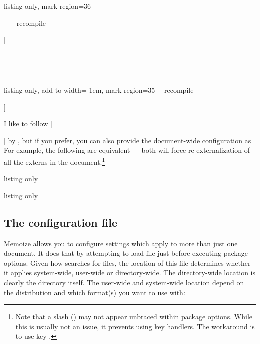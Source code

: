 \documentclass[a4paper,11pt]{article}
\begin{document}
\begin{tcbraster}[raster columns=2, raster equal height=rows, raster force size=false]
\begin{tcblisting}{listing only, mark region={3}{6}}
~{~
  ~\mmzset~{recompile}
  \begin{forest}
    [VP[V][DP]]
  \end{forest}
~}~
\end{tcblisting}
\begin{tcblisting}{listing only, add to width=-1em, mark region={3}{5}}
~\mmznext~{recompile}
\begin{forest}
  [VP[V][DP]]
\end{forest}

\end{tcblisting} 
\end{tcbraster}

I like to follow |\usepackage{memoize}| by , but if you prefer,
you can also provide the document-wide configuration as 
For example, the following are equivalent --- both will force
re-externalization of all the externs in the document.\footnote{Note that a
  slash (\code{/}) may not appear unbraced within package options.  While this
  is usually not an issue, it prevents using  key handlers.  The
  workaround is to use key .}

\begin{tcbraster}[raster columns=2, raster equal height=rows]
  \begin{tcblisting}{listing only}
\usepackage{memoize}
  \end{tcblisting}
  \begin{tcblisting}{listing only}
\usepackage[recompile]{memoize}
  \end{tcblisting}
\end{tcbraster}


\subsection{The configuration file}
\label{sec:memoize.cfg}

Memoize allows you to configure settings which apply to more than just one
document.  It does that by attempting to load file 
just before executing package options.  Given how  searches for
files, the location of this file determines whether it applies system-wide,
user-wide or directory-wide.  The directory-wide location is clearly the
directory itself.  The user-wide and system-wide location depend on the
 distribution and which format(s) you want to use
 with:
\end{document}

